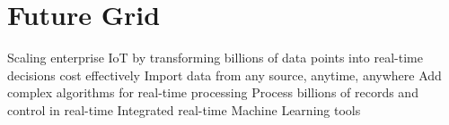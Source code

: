 \section{Future Grid}
Scaling enterprise IoT by transforming billions of data points into real-time
decisions cost effectively\cite{www-futuregrid}
Import data from any source, anytime, anywhere
Add complex algorithms for real-time processing
Process billions of records and control in real-time
Integrated real-time Machine Learning tools
